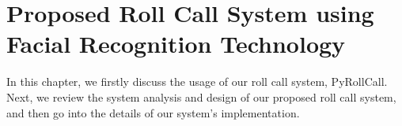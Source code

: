 \chapter{Proposed Roll Call System using Facial Recognition Technology}
In this chapter, we firstly discuss the usage of our roll call system, PyRollCall.
Next, we review the system analysis and design of our proposed roll call system,
and then go into the details of our system's implementation.




